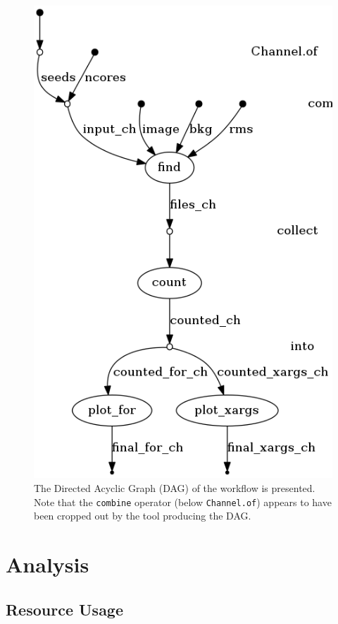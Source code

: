 \documentclass{article}
\begin{document}
\begin{figure}[h]
  \centering
  \includegraphics[scale = 0.4]{../nextflow/logs/final_dag.png}
  \caption[Workflow DAG]{
    The Directed Acyclic Graph (DAG) of the workflow is presented.
    Note that the \lstinline{combine} operator (below \lstinline{Channel.of})
    appears to have been cropped out by the tool producing the DAG.
  }
  \label{fig:workflow-dag}
\end{figure}

\clearpage

\section{Analysis}
\label{sec:analysis}

\subsection{Resource Usage}
\label{sec:resource-usage}
\end{document}
